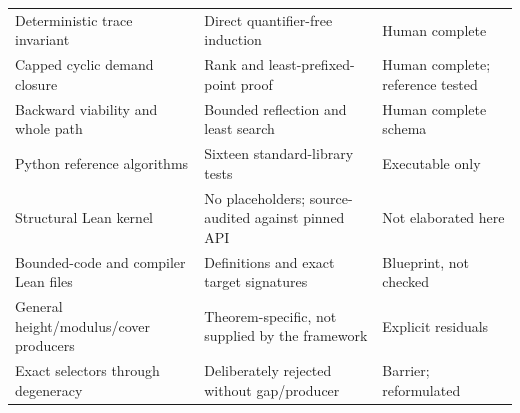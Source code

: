 \begin{longtable}{@{}p{}p{}p{}@{}}
Deterministic trace invariant & Direct quantifier-free induction & Human complete \\
Capped cyclic demand closure & Rank and least-prefixed-point proof & Human complete;
reference tested \\
Backward viability and whole path & Bounded reflection and least search & Human
complete schema \\
Python reference algorithms & Sixteen standard-library tests & Executable only \\
Structural Lean kernel & No placeholders; source-audited against pinned API & Not
elaborated here \\
Bounded-code and compiler Lean files & Definitions and exact target signatures &
Blueprint, not checked \\
General height/modulus/cover producers & Theorem-specific, not supplied by the
framework & Explicit residuals \\
Exact selectors through degeneracy & Deliberately rejected without gap/producer &
Barrier; reformulated \\
\bottomrule
\end{longtable}
\normalsize
